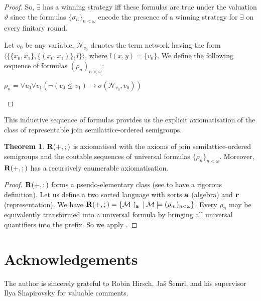 \documentclass[a4paper]{article}
\theoremstyle{definition}
\theoremstyle{theorem}
\newtheorem{theorem}{Theorem}
\theoremstyle{proposition}
\theoremstyle{lemma}
\theoremstyle{ex}
\theoremstyle{corollary}
\theoremstyle{claim}
\begin{document}
\begin{proof}
  So, $\exists$ has a winning strategy iff these formulas are true under the valuation $\vartheta$ since the formulas $\{ \sigma_n \}_{n < \omega}$ encode the presence of a winning strategy for $\exists$ on every finitary round.

  Let $v_0$ be any variable, $\mathcal{N}_{v_0}$ denotes the term network having the form
  $\langle \{ \{ x_0, x_1 \}, \{ (x_0, x_1) \}, l \} \rangle$, where $l(x,y) = \{ v_0 \}$.
  We define the following sequence of formulas $(\rho_n)_{n < \omega}$:
  \begin{center}
    $\rho_n = \forall v_0 \forall v_1 (\neg (v_0 \leq v_1) \to \sigma(\mathcal{N}_{v_0}, v_0))$
  \end{center}
\end{proof}

This inductive sequence of formulas provides us the explicit axiomatisation of the class of representable join semilattice-ordered semigroups.

\begin{theorem}\label{axiomatisation}
  ${\bf R}(+, ;)$ is axiomatised with the axioms of join semilattice-ordered semigroups and the coutable sequences of universal formulas $\{ \rho_n \}_{n < \omega}$. Moreover, ${\bf R}(+, ;)$ has a recursively enumerable axiomatisation.
\end{theorem}

\begin{proof}
  ${\bf R}(+, ;)$ forms a pseudo-elementary class (see \cite{eklof1977ultraproducts} to have a rigorous definition). Let us define a two sorted language with sorts ${\bf a}$ (algebra) and ${\bf r}$ (representation). We have ${\bf R}(+, ;) = \{ \mathcal{M} \upharpoonright_{\bf a} \: | \: \mathcal{M} \models (\rho_m)_{n < \omega} \}$.
  Every $\rho_n$ may be equivalently transformed into a universal formula by bringing all universal quantifiers into the prefix.
  So we apply \cite[Theorem 9.28]{hirsch2002relation}.
\end{proof}

\section{Acknowledgements}

The author is sincerely grateful to Robin Hirsch, Ja\v{s} \v{S}emrl, and his supervisor Ilya Shapirovsky for valuable comments.



\end{document}

